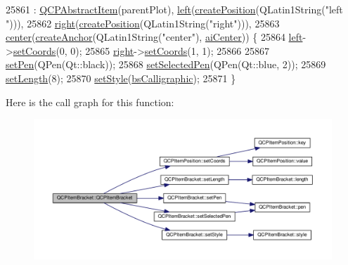 \begin{DoxyCode}
25861     : \hyperlink{class_q_c_p_abstract_item_a9922507d8b4503a1fe1ed0b1030e23b6}{QCPAbstractItem}(parentPlot), \hyperlink{class_q_c_p_item_bracket_af6cc6d27d96171778c6927d6edce48b0}{left}(\hyperlink{class_q_c_p_abstract_item_a75036d39c4d4e2e1a7dd145fff915d32}{createPosition}(QLatin1String(\textcolor{stringliteral}{"left
      "}))),
25862       \hyperlink{class_q_c_p_item_bracket_afa6c1360b05a50c4e0df37b3cebab6be}{right}(\hyperlink{class_q_c_p_abstract_item_a75036d39c4d4e2e1a7dd145fff915d32}{createPosition}(QLatin1String(\textcolor{stringliteral}{"right"}))),
25863       \hyperlink{class_q_c_p_item_bracket_a2dbcabdf5f467f28be12a7b25962ffca}{center}(\hyperlink{class_q_c_p_abstract_item_af3fc92527802078ca395138748b629a7}{createAnchor}(QLatin1String(\textcolor{stringliteral}{"center"}), \hyperlink{class_q_c_p_item_bracket_a7f3a6a56d67f71219ed220553f3dd861a17b57ef34cc05eadfe9becd1ad5b5242}{aiCenter})) \{
25864   \hyperlink{class_q_c_p_item_bracket_af6cc6d27d96171778c6927d6edce48b0}{left}->\hyperlink{class_q_c_p_item_position_aa988ba4e87ab684c9021017dcaba945f}{setCoords}(0, 0);
25865   \hyperlink{class_q_c_p_item_bracket_afa6c1360b05a50c4e0df37b3cebab6be}{right}->\hyperlink{class_q_c_p_item_position_aa988ba4e87ab684c9021017dcaba945f}{setCoords}(1, 1);
25866 
25867   \hyperlink{class_q_c_p_item_bracket_ab13001d9cc5d8f9e56ea15bdda682acb}{setPen}(QPen(Qt::black));
25868   \hyperlink{class_q_c_p_item_bracket_a349785c31122778a520c64891fa204c5}{setSelectedPen}(QPen(Qt::blue, 2));
25869   \hyperlink{class_q_c_p_item_bracket_ac7cfc3da7da9b5c5ac5dfbe4f0351b2a}{setLength}(8);
25870   \hyperlink{class_q_c_p_item_bracket_a612dffa2373422eef8754d690add3703}{setStyle}(\hyperlink{class_q_c_p_item_bracket_a7ac3afd0b24a607054e7212047d59dbda8f29f5ef754e2dc9a9efdedb2face0f3}{bsCalligraphic});
25871 \}
\end{DoxyCode}


Here is the call graph for this function\+:\nopagebreak
\begin{figure}[H]
\begin{center}
\leavevmode
\includegraphics[width=350pt]{class_q_c_p_item_bracket_a44ecfa37a76de5e3549e2d61f9d8ee56_cgraph}
\end{center}
\end{figure}


